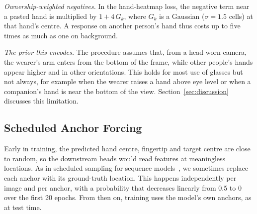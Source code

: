 \emph{Ownership-weighted negatives.} In the hand-heatmap loss, the negative term near a pasted hand is multiplied by $1+4\,G_k$, where $G_k$ is a Gaussian ($\sigma{=}1.5$ cells) at that hand's centre. A response on another person's hand thus costs up to five times as much as one on background.

\emph{The prior this encodes.} The procedure assumes that, from a head-worn camera, the wearer's arm enters from the bottom of the frame, while other people's hands appear higher and in other orientations. This holds for most use of glasses but not always, for example when the wearer raises a hand above eye level or when a companion's hand is near the bottom of the view. Section~\ref{sec:discussion} discusses this limitation.

\subsection{Scheduled Anchor Forcing}\label{sec:forcing}
Early in training, the predicted hand centre, fingertip and target centre are close to random, so the downstream heads would read features at meaningless locations. As in scheduled sampling for sequence models~\cite{bengio2015scheduled}, we sometimes replace each anchor with its ground-truth location. This happens independently per image and per anchor, with a probability that decreases linearly from 0.5 to 0 over the first 20 epochs. From then on, training uses the model's own anchors, as at test time.
